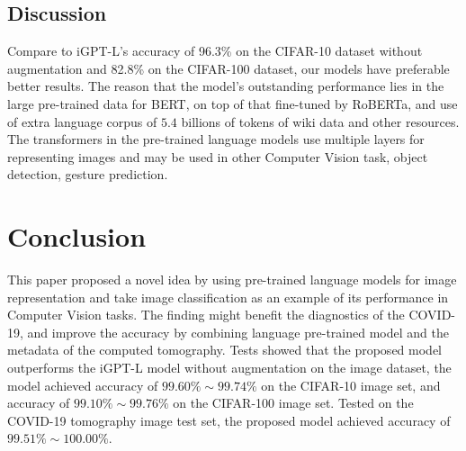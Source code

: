 \documentclass[review]{cvpr}
\begin{document}
\subsection{Discussion}

 Compare to iGPT-L's accuracy of 96.3\% on the CIFAR-10 dataset without augmentation and 82.8\% on the CIFAR-100 dataset, our models have preferable better results.
The reason that the model's outstanding performance lies in the large pre-trained data for BERT, on top of that fine-tuned by RoBERTa, and use of extra language corpus of
$5.4$ billions of tokens of wiki data and other resources.
The transformers in the pre-trained language models use multiple layers for representing images and may be used in other Computer Vision task, \eg object detection, gesture prediction.


\section{Conclusion}

This paper proposed a novel idea by using pre-trained language models for image representation and take image classification as an example of its performance in Computer Vision tasks.
The finding might benefit the diagnostics of the COVID-19, and improve the accuracy by combining language pre-trained model and the metadata of the computed tomography.
Tests showed that the proposed model outperforms the iGPT-L model without augmentation on the image dataset,
the model achieved accuracy of $99.60\%\sim99.74\%$ on the CIFAR-10 image set,
and accuracy of $99.10\%\sim99.76\%$ on the CIFAR-100 image set.
Tested on the COVID-19 tomography image test set, the proposed model achieved accuracy of $99.51\%\sim100.00\%$.
\end{document}
